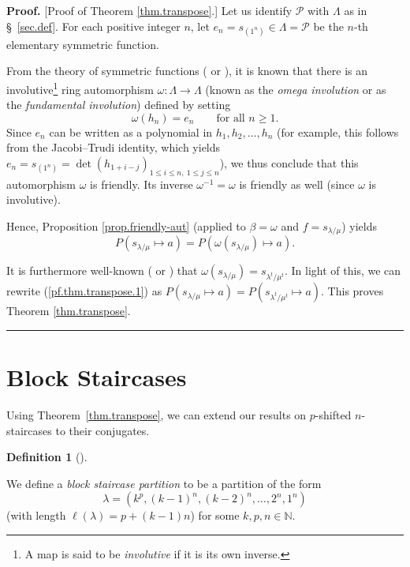 \documentclass[numbers=enddot,12pt,final,onecolumn,notitlepage]{scrartcl}%
\theoremstyle{definition}
\newtheorem{defi}[theo]{Definition}
\newenvironment{definition}[1][]
{\begin{defi}[#1]\begin{leftbar}}
{\end{leftbar}\end{defi}}
\newenvironment{proof}[1][Proof]{\noindent\textbf{#1.} }{\ \rule{0.5em}{0.5em}}
\newcommand{\NN}{\mathbb{N}}
\renewcommand{\leq}{\leqslant}
\renewcommand{\geq}{\geqslant}
\theoremstyle{plainsl}
\begin{document}
\begin{proof}
[Proof of Theorem \ref{thm.transpose}.] Let us identify $\mathcal{P}$ with
$\Lambda$ as in \S \ \ref{sec.def}. For each positive integer $n$, let
$e_{n}=s_{\left(  1^{n}\right)  }\in\Lambda=\mathcal{P}$ be the $n$-th
elementary symmetric function.

From the theory of symmetric functions (\cite[\S 7.6]{EC2} or \cite[(2.7)]%
{Macdonald}), it is known that there is an involutive\footnote{A map is said
to be \emph{involutive} if it is its own inverse.} ring automorphism
$\omega:\Lambda\rightarrow\Lambda$ (known as the \emph{omega involution} or as
the \emph{fundamental involution}) defined by setting
\[
\omega\left(  h_{n}\right)  =e_{n}\qquad\text{for all }n\geq1.
\]
Since $e_{n}$ can be written as a polynomial in $h_{1},h_{2},\ldots,h_{n}$
(for example, this follows from the Jacobi--Trudi identity, which yields
$e_{n}=s_{\left(  1^{n}\right)  }=\det\left(  h_{1+i-j}\right)  _{1\leq i\leq
n,\ 1\leq j\leq n}$), we thus conclude that this automorphism $\omega$ is
friendly. Its inverse $\omega^{-1}=\omega$ is friendly as well (since $\omega$
is involutive).

Hence, Proposition \ref{prop.friendly-aut} (applied to $\beta=\omega$ and
$f=s_{\lambda/\mu}$) yields%
\begin{equation}
P\left(  s_{\lambda/\mu}\mapsto a\right)  =P\left(  \omega\left(
s_{\lambda/\mu}\right)  \mapsto a\right)  .\label{pf.thm.transpose.1}%
\end{equation}


It is furthermore well-known (\cite[Theorem 7.15.6]{EC2} or \cite[(5.6)]%
{Macdonald}) that $\omega\left(  s_{\lambda/\mu}\right)  =s_{\lambda^{t}%
/\mu^{t}}$. In light of this, we can rewrite (\ref{pf.thm.transpose.1}) as
$P\left(  s_{\lambda/\mu}\mapsto a\right)  =P\left(  s_{\lambda^{t}/\mu^{t}%
}\mapsto a\right)  $. This proves Theorem \ref{thm.transpose}.
\end{proof}


\section{Block Staircases}

Using Theorem~\ref{thm.transpose}, we can extend our results on $p$-shifted $n$-staircases to their conjugates.

\begin{definition}
We define a \emph{block staircase partition} to be a partition of the form 
\[\lambda = ( k^p, (k-1)^n, (k-2)^n, \ldots,  2^n, 1^n
)
\]
(with length $\ell(\lambda) = p+(k-1)n$)
for some $k, p, n \in \NN$.
\end{definition}
\end{document}
